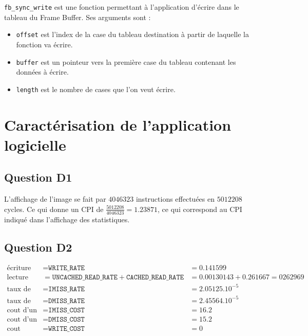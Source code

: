 \documentclass{article}
\begin{document}
\texttt{fb\_sync\_write} est une fonction permettant à l'application d'écrire dans le tableau du Frame Buffer. Ses arguments sont :

\begin{itemize}
  \item \texttt{offset} est l'index de la case du tableau destination à partir de laquelle la fonction va écrire.
  \item \texttt{buffer} est un pointeur vers la première case du tableau contenant les données à écrire.
  \item \texttt{length} est le nombre de cases que l'on veut écrire.
\end{itemize}

\section{Caractérisation de l'application logicielle}

\subsection{Question D1}

L'affichage de l'image se fait par $4046323$ instructions effectuées en $5012208$ cycles. Ce qui donne un CPI de $\frac{5012208}{4046323} = 1.23871$, ce qui correspond au CPI indiqué dans l'affichage des statistiques.

\subsection{Question D2}

\begin{align*}
\text{écriture}		&= \texttt{WRITE\_RATE} &= 0.141599 \\
\text{lecture}		&= \texttt{UNCACHED\_READ\_RATE} + \texttt{CACHED\_READ\_RATE}
			&= 0.00130143 + 0.261667
			= 0262969 \\
\text{taux de miss I}	&= \texttt{IMISS\_RATE} &= 2.05125.10^{-5} \\
\text{taux de miss D}	&= \texttt{DMISS\_RATE} &= 2.45564.10^{-5} \\
\text{cout d'un miss I}	&= \texttt{IMISS\_COST} &= 16.2 \\
\text{cout d'un miss D}	&= \texttt{DMISS\_COST} &= 15.2 \\
\text{cout d'écriture}	&= \texttt{WRITE\_COST} &= 0 \\
\end{align*}
\end{document}
